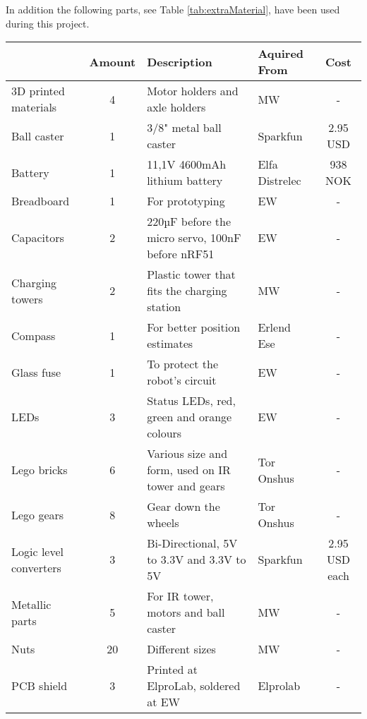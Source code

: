 In addition the following parts, see Table \ref{tab:extraMaterial}, have been used during this project.

\begin{sidewaystable}[ht]
\centering
\caption{Extra Material}
\label{tab:extraMaterial}
\begin{tabular}{|l|c|l|l|c|}
\hline
\rowcolor[HTML]{C0C0C0} 
\multicolumn{1}{|l|}{\cellcolor[HTML]{C0C0C0}\textbf{Part}} & \multicolumn{1}{l|}{\cellcolor[HTML]{C0C0C0}\textbf{Amount}} & \multicolumn{1}{l|}{\cellcolor[HTML]{C0C0C0}\textbf{Description}} & \multicolumn{1}{l|}{\cellcolor[HTML]{C0C0C0}\textbf{Aquired From}} & \multicolumn{1}{c|}{\cellcolor[HTML]{C0C0C0}\textbf{Cost}} \\ \hline
3D printed materials & 4 & Motor  holders and axle holders & MW & - \\
Ball caster & 1 & 3/8" metal ball caster & Sparkfun & 2.95 USD \\
Battery & 1 & 11,1V 4600mAh lithium battery & Elfa Distrelec & 938 NOK \\
Breadboard & 1 & For prototyping & EW & - \\
Capacitors & 2 & 220µF before the micro servo, 100nF before nRF51 & EW & - \\
Charging towers & 2 & Plastic tower that fits the charging station & MW & - \\
Compass & 1 & For better position estimates & Erlend Ese & - \\
Glass fuse & 1 & To protect the robot's circuit & EW & - \\
LEDs & 3 & Status LEDs, red, green and orange colours & EW & - \\
Lego bricks & 6 & Various size and form, used on IR tower and gears & Tor Onshus & - \\
Lego gears & 8 & Gear down the wheels & Tor Onshus & - \\
Logic level converters & 3 & Bi-Directional, 5V to 3.3V and 3.3V to 5V & Sparkfun & 2.95 USD each \\
Metallic parts & 5 & For IR tower, motors and ball caster & MW & - \\
Nuts & 20 & Different sizes & MW & - \\
PCB shield & 3 & Printed at ElproLab, soldered at EW & Elprolab & - \\

\end{tabular}
\end{sidewaystable}
